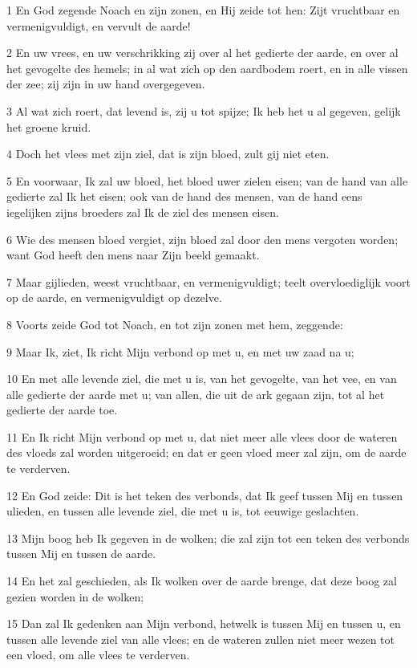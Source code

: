 \par 1 En God zegende Noach en zijn zonen, en Hij zeide tot hen: Zijt vruchtbaar en vermenigvuldigt, en vervult de aarde!
\par 2 En uw vrees, en uw verschrikking zij over al het gedierte der aarde, en over al het gevogelte des hemels; in al wat zich op den aardbodem roert, en in alle vissen der zee; zij zijn in uw hand overgegeven.
\par 3 Al wat zich roert, dat levend is, zij u tot spijze; Ik heb het u al gegeven, gelijk het groene kruid.
\par 4 Doch het vlees met zijn ziel, dat is zijn bloed, zult gij niet eten.
\par 5 En voorwaar, Ik zal uw bloed, het bloed uwer zielen eisen; van de hand van alle gedierte zal Ik het eisen; ook van de hand des mensen, van de hand eens iegelijken zijns broeders zal Ik de ziel des mensen eisen.
\par 6 Wie des mensen bloed vergiet, zijn bloed zal door den mens vergoten worden; want God heeft den mens naar Zijn beeld gemaakt.
\par 7 Maar gijlieden, weest vruchtbaar, en vermenigvuldigt; teelt overvloediglijk voort op de aarde, en vermenigvuldigt op dezelve.
\par 8 Voorts zeide God tot Noach, en tot zijn zonen met hem, zeggende:
\par 9 Maar Ik, ziet, Ik richt Mijn verbond op met u, en met uw zaad na u;
\par 10 En met alle levende ziel, die met u is, van het gevogelte, van het vee, en van alle gedierte der aarde met u; van allen, die uit de ark gegaan zijn, tot al het gedierte der aarde toe.
\par 11 En Ik richt Mijn verbond op met u, dat niet meer alle vlees door de wateren des vloeds zal worden uitgeroeid; en dat er geen vloed meer zal zijn, om de aarde te verderven.
\par 12 En God zeide: Dit is het teken des verbonds, dat Ik geef tussen Mij en tussen ulieden, en tussen alle levende ziel, die met u is, tot eeuwige geslachten.
\par 13 Mijn boog heb Ik gegeven in de wolken; die zal zijn tot een teken des verbonds tussen Mij en tussen de aarde.
\par 14 En het zal geschieden, als Ik wolken over de aarde brenge, dat deze boog zal gezien worden in de wolken;
\par 15 Dan zal Ik gedenken aan Mijn verbond, hetwelk is tussen Mij en tussen u, en tussen alle levende ziel van alle vlees; en de wateren zullen niet meer wezen tot een vloed, om alle vlees te verderven.
